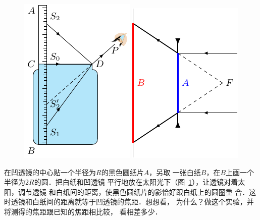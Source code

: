 \begin{figure}[htbp]
    \centering
    \begin{minipage}[t]{0.48\textwidth}
        \centering
        \includegraphics{fig/C/10-14.pdf}
        \caption{}\label{fig_C_10-14}
    \end{minipage}
    \begin{minipage}[t]{0.48\textwidth}
        \centering
        \includegraphics{fig/C/10-15.pdf}
        \caption{}\label{fig_C_10-15}
    \end{minipage}
\end{figure}



在凹透镜的中心贴一个半径为$R$的黑色圆纸片$A$，另取
一张白纸$B$，在$B$上画一个半径为$2R$的圆．把白纸和凹透镜
平行地放在太阳光下（图~\ref{fig_C_10-15}），让透镜对着太阳，调节透镜
和白纸间的距离，使黑色圆纸片的影恰好跟白纸上的圆圈重
合．这时透镜和白纸间的距离就等于凹透镜的焦距．想想看，
为什么？做这个实验，并将测得的焦距跟已知的焦距相比较，
看相差多少．




